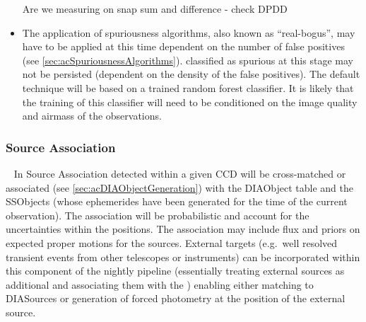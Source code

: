 \begin{itemize}
\begin{note} Are we measuring on snap sum and difference - check DPDD\end{note}
\item The application of spuriousness algorithms, also known as ``real-bogus'', may have to be applied at this time dependent on the number of false positives (see \ref{sec:acSpuriousnessAlgorithms}). \DIASources classified as spurious at this stage may not be persisted (dependent on the density of the false positives). The default technique will be based on a trained random forest classifier. It is likely that the training of this classifier will need to be conditioned on the image quality and airmass of the observations.
\end{itemize}

\subsubsection{Source Association}~
In Source Association \DIASources detected within a given CCD will be cross-matched or associated (see \ref{sec:acDIAObjectGeneration}) with the DIAObject table and the SSObjects (whose ephemerides have been generated for the time of the current observation). The association will be probabilistic  and account for the uncertainties within the positions. The association may include flux and priors on expected proper motions for the sources. External targets (e.g.\ well resolved transient events from other telescopes or instruments) can be incorporated within this component of the nightly pipeline (essentially treating external sources as additional \DIAObjects and associating them with the \DIASources) enabling either matching to DIASources or generation of forced photometry at the position of the external source. 


